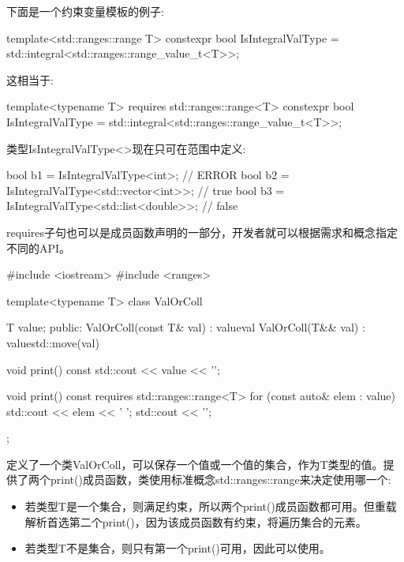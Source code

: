 
下面是一个约束变量模板的例子:

\begin{cpp}
template<std::ranges::range T>
constexpr bool IsIntegralValType = std::integral<std::ranges::range_value_t<T>>;
\end{cpp}

这相当于:

\begin{cpp}
template<typename T>
requires std::ranges::range<T>
constexpr bool IsIntegralValType = std::integral<std::ranges::range_value_t<T>>;
\end{cpp}

类型IsIntegralValType<>现在只可在范围中定义:

\begin{cpp}
bool b1 = IsIntegralValType<int>; // ERROR
bool b2 = IsIntegralValType<std::vector<int>>; // true
bool b3 = IsIntegralValType<std::list<double>>; // false
\end{cpp}


requires子句也可以是成员函数声明的一部分，开发者就可以根据需求和概念指定不同的API。


\begin{cpp}
#include <iostream>
#include <ranges>

template<typename T>
class ValOrColl {
	T value;
	public:
	ValOrColl(const T& val)
	: value{val} {
	}
	ValOrColl(T&& val)
	: value{std::move(val)} {
	}

	void print() const {
		std::cout << value << '\n';
	}

	void print() const requires std::ranges::range<T> {
		for (const auto& elem : value) {
			std::cout << elem << ' ';
		}
		std::cout << '\n';
	}
};
\end{cpp}

定义了一个类ValOrColl，可以保存一个值或一个值的集合，作为T类型的值。提供了两个print()成员函数，类使用标准概念std::ranges::range来决定使用哪一个:

\begin{itemize}
\item
若类型T是一个集合，则满足约束，所以两个print()成员函数都可用。但重载解析首选第二个print()，因为该成员函数有约束，将遍历集合的元素。

\item
若类型T不是集合，则只有第一个print()可用，因此可以使用。
\end{itemize}

